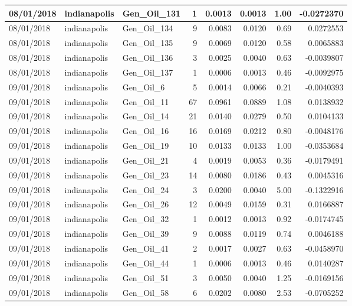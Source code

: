 \documentclass[
  letterpaper,
  DIV=11,
  numbers=noendperiod]{scrartcl}
\begin{document}
\begin{tabular}{l|l|l|r|r|r|r|r}
\hline
08/01/2018 & indianapolis & Gen\_Oil\_131 & 1 & 0.0013 & 0.0013 & 1.00 & -0.0272370\\
\hline
08/01/2018 & indianapolis & Gen\_Oil\_134 & 9 & 0.0083 & 0.0120 & 0.69 & 0.0272553\\
\hline
08/01/2018 & indianapolis & Gen\_Oil\_135 & 9 & 0.0069 & 0.0120 & 0.58 & 0.0065883\\
\hline
08/01/2018 & indianapolis & Gen\_Oil\_136 & 3 & 0.0025 & 0.0040 & 0.63 & -0.0039807\\
\hline
08/01/2018 & indianapolis & Gen\_Oil\_137 & 1 & 0.0006 & 0.0013 & 0.46 & -0.0092975\\
\hline
09/01/2018 & indianapolis & Gen\_Oil\_6 & 5 & 0.0014 & 0.0066 & 0.21 & -0.0040393\\
\hline
09/01/2018 & indianapolis & Gen\_Oil\_11 & 67 & 0.0961 & 0.0889 & 1.08 & 0.0138932\\
\hline
09/01/2018 & indianapolis & Gen\_Oil\_14 & 21 & 0.0140 & 0.0279 & 0.50 & 0.0104133\\
\hline
09/01/2018 & indianapolis & Gen\_Oil\_16 & 16 & 0.0169 & 0.0212 & 0.80 & -0.0048176\\
\hline
09/01/2018 & indianapolis & Gen\_Oil\_19 & 10 & 0.0133 & 0.0133 & 1.00 & -0.0353684\\
\hline
09/01/2018 & indianapolis & Gen\_Oil\_21 & 4 & 0.0019 & 0.0053 & 0.36 & -0.0179491\\
\hline
09/01/2018 & indianapolis & Gen\_Oil\_23 & 14 & 0.0080 & 0.0186 & 0.43 & 0.0045316\\
\hline
09/01/2018 & indianapolis & Gen\_Oil\_24 & 3 & 0.0200 & 0.0040 & 5.00 & -0.1322916\\
\hline
09/01/2018 & indianapolis & Gen\_Oil\_26 & 12 & 0.0049 & 0.0159 & 0.31 & 0.0166887\\
\hline
09/01/2018 & indianapolis & Gen\_Oil\_32 & 1 & 0.0012 & 0.0013 & 0.92 & -0.0174745\\
\hline
09/01/2018 & indianapolis & Gen\_Oil\_39 & 9 & 0.0088 & 0.0119 & 0.74 & 0.0046188\\
\hline
09/01/2018 & indianapolis & Gen\_Oil\_41 & 2 & 0.0017 & 0.0027 & 0.63 & -0.0458970\\
\hline
09/01/2018 & indianapolis & Gen\_Oil\_44 & 1 & 0.0006 & 0.0013 & 0.46 & 0.0140287\\
\hline
09/01/2018 & indianapolis & Gen\_Oil\_51 & 3 & 0.0050 & 0.0040 & 1.25 & -0.0169156\\
\hline
09/01/2018 & indianapolis & Gen\_Oil\_58 & 6 & 0.0202 & 0.0080 & 2.53 & -0.0705252\\

\end{tabular}
\end{document}
